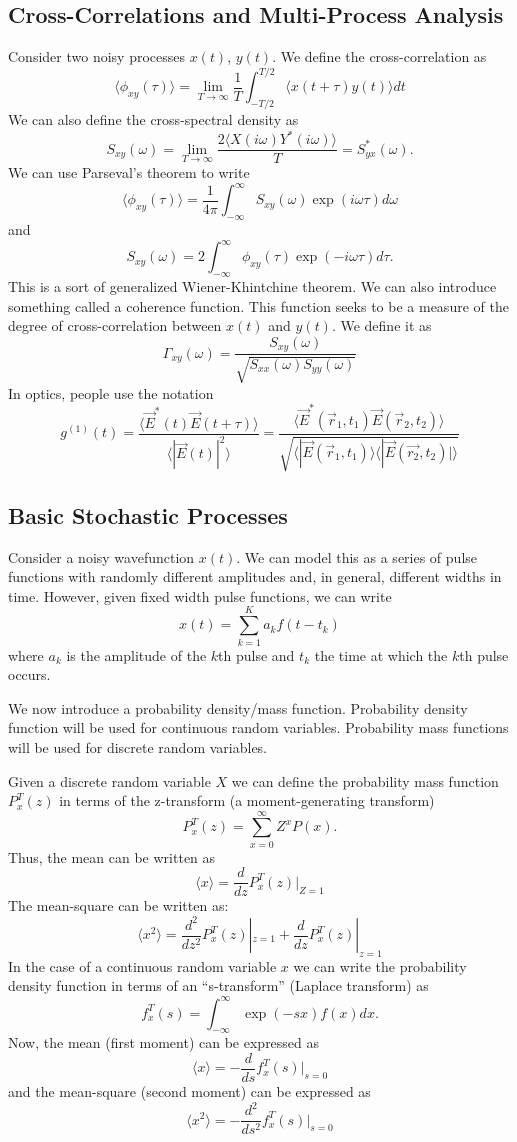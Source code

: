 \documentclass{article}
\begin{document}
\subsection{Cross-Correlations and Multi-Process Analysis}
Consider two noisy processes $ x(t) $, $ y(t) $. We define the cross-correlation
as
\[
   \langle \phi_{xy}(\tau) \rangle = \lim_{T \to \infty} \frac{1}{T} \int_{-T/2}^{T/2}
   \langle x(t+\tau) y(t) \rangle dt
\]
We can also define the cross-spectral density as
\[
   S_{xy}(\omega) = \lim_{T \to \infty} \frac{2 \langle X(i\omega) Y^{*}(i\omega) \rangle}{T}
   = S_{yx}^{*}(\omega).
\]
We can use Parseval's theorem to write
\[
   \langle \phi_{xy}(\tau) \rangle = \frac{1}{4\pi}
   \int_{-\infty}^{\infty}S_{xy}(\omega) \exp(i\omega \tau) d\omega
\]
and
\[
   S_{xy}(\omega) = 2 \int_{-\infty}^{\infty} \phi_{xy}(\tau)\exp(-i\omega \tau)
   d\tau.
\]
This is a sort of generalized Wiener-Khintchine theorem.
We can also introduce something called a coherence function. This function seeks
to be a measure of the degree of cross-correlation between $ x(t) $ and $ y(t)
$. We define it as
\[
   \Gamma_{xy}(\omega) =
   \frac{S_{xy}(\omega)}{\sqrt{S_{xx}(\omega)S_{yy}(\omega)}}
\]
In optics, people use the notation
\[
   g^{(1)}(t) = \frac{\langle \vec{E}^*(t) \vec{E}(t+\tau)\rangle}{\langle |
         \vec{E}(t) |^2 \rangle} = \frac{\langle \vec{E}^*(\vec{r}_{1},t_{1})
         \vec{E}(\vec{r}_{2},t_{2}) \rangle}{\sqrt{\langle | \vec{E}(\vec{r}_{1},t_{1})
            \rangle \langle
         |\vec{E}(\vec{r_2},t_2)| \rangle}}
\]
\subsection{Basic Stochastic Processes}
Consider a noisy wavefunction $ x(t) $. We can model this as a series of pulse
functions with randomly different amplitudes and, in general, different widths in
time. However, given fixed width pulse functions, we can write
\[
   x(t) = \sum^{K}_{k=1} a_{k}f(t-t_{k})
\]
where $ a_k $ is the amplitude of the $ k $th pulse and $ t_{k} $ the time at
which the $ k $th pulse occurs.

We now introduce a probability density/mass function. Probability density
function will be used for continuous random variables. Probability mass functions
will be used for discrete random variables.

Given a discrete random variable $ X $ we can define the probability mass
function $ P_{x}^{T}(z) $ in terms of the z-transform (a moment-generating transform)
\[
   P_{x}^{T}(z) = \sum^{\infty}_{x=0} Z^{x}P(x).
\]
Thus, the mean can be written as
\[
   \langle x \rangle = \frac{d}{dz} P_{x}^{T}(z)|_{Z=1}
\]
The mean-square can be written as:
\[
   \langle x^2 \rangle = \frac{d^2}{dz^2}P_{x}^T(z)|_{z=1} +
   \frac{d}{dz}P_{x}^T(z)|_{z=1}
\]
In the case of a continuous random variable $ x $ we can write the probability
density function in terms of an ``s-transform'' (Laplace transform) as
\[
   f_{x}^T(s) = \int_{-\infty}^{\infty}\exp(-s x) f(x) dx.
\]
Now, the mean (first moment) can be expressed as
\[
   \langle x \rangle = -\frac{d}{ds} f_{x}^{T}(s)|_{s=0}
\]
and the mean-square (second moment) can be expressed as
\[
   \langle x^2 \rangle = -\frac{d^2}{ds^2} f_{x}^{T}(s)|_{s=0}
\]
\end{document}
